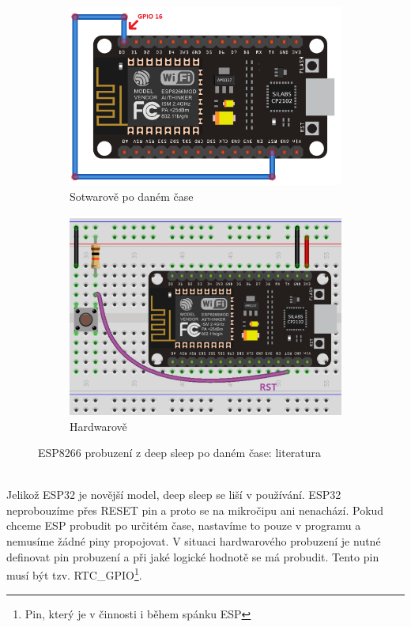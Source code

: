 \documentclass[a4paper, 12pt]{report}
\begin{document}
    \begin{figure}[h!]
        \centering
        \begin{subfigure}[b]{0.4\linewidth}
            \includegraphics[width=\linewidth]{images/ESP8266_timed_deepsleep}
            \caption{Sotwarově po daném čase}
        \end{subfigure}
        \begin{subfigure}[b]{0.4\linewidth}
            \includegraphics[width=\linewidth]{images/ESP8266_pressed_deepsleep}
            \caption{Hardwarově}
        \end{subfigure}
        \caption{ESP8266 probuzení z deep sleep po daném čase: literatura~\cite{randomnerd}}
        \label{fig:esp8266_timed_pressed_deepsleep}
    \end{figure}\\
    Jelikož ESP32 je novější model, deep sleep se liší v používání.
    ESP32 neprobouzíme přes RESET pin a proto se na mikročipu ani nenachází.
    Pokud chceme ESP probudit po určitém čase, nastavíme to pouze v programu a nemusíme žádné piny propojovat.
    V situaci hardwarového probuzení je nutné definovat pin probuzení a při jaké logické hodnotě se má probudit.
    Tento pin musí být tzv. RTC\_GPIO\footnote{Pin, který je v činnosti i během spánku ESP}.
\end{document}
